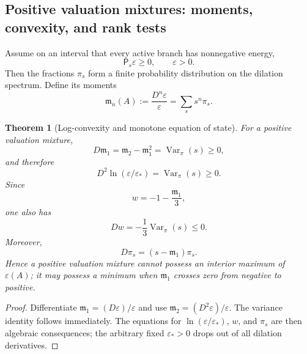\documentclass[11pt,a4paper]{article}
\def\Dil{D}%
\numberwithin{equation}{section}
\theoremstyle{definition}
\theoremstyle{plain}
\newtheorem{theorem}[criterion]{Theorem}
\theoremstyle{remark}
\newcommand{\Dil}{\mathscr{D}}
\begin{document}
\subsection{Positive valuation mixtures: moments, convexity, and rank tests}
Assume on an interval that every active branch has nonnegative energy,
\begin{equation}
\mathsf P_s\varepsilon\ge0,
\qquad
\varepsilon>0.
\end{equation}
Then the fractions \(\pi_s\) form a finite probability distribution on the dilation spectrum. Define its moments
\begin{equation}
\mathfrak m_n(A)
:=\frac{\Dil^n\varepsilon}{\varepsilon}
=\sum_s s^n\pi_s.
\end{equation}

\begin{theorem}[Log-convexity and monotone equation of state]
For a positive valuation mixture,
\begin{equation}
\boxed{
\Dil\mathfrak m_1
=\mathfrak m_2-\mathfrak m_1^2
=\operatorname{Var}_{\pi}(s)\ge0,
}
\end{equation}
and therefore
\begin{equation}
\boxed{
\Dil^2\ln(\varepsilon/\varepsilon_*)
=\operatorname{Var}_{\pi}(s)\ge0.
}
\end{equation}
Since
\begin{equation}
w=-1-\frac{\mathfrak m_1}{3},
\end{equation}
one also has
\begin{equation}
\boxed{
\Dil w=-\frac13\operatorname{Var}_{\pi}(s)\le0.
}
\end{equation}
Moreover,
\begin{equation}
\Dil\pi_s=(s-\mathfrak m_1)\pi_s.
\end{equation}
Hence a positive valuation mixture cannot possess an interior maximum of \(\varepsilon(A)\); it may possess a minimum when \(\mathfrak m_1\) crosses zero from negative to positive.
\end{theorem}
\begin{proof}
Differentiate \(\mathfrak m_1=(\Dil\varepsilon)/\varepsilon\) and use \(\mathfrak m_2=(\Dil^2\varepsilon)/\varepsilon\). The variance identity follows immediately. The equations for \(\ln(\varepsilon/\varepsilon_*)\), \(w\), and \(\pi_s\) are then algebraic consequences; the arbitrary fixed \(\varepsilon_*>0\) drops out of all dilation derivatives.
\end{proof}
\end{document}
